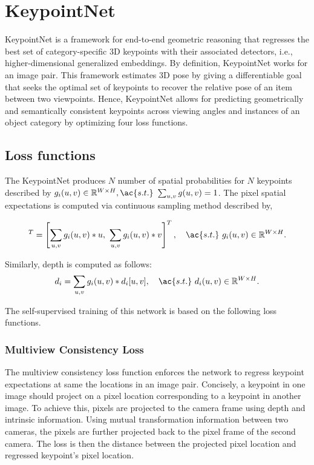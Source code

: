\section{KeypointNet}

KeypointNet is a framework for end-to-end geometric reasoning that regresses the best set of category-specific 3D keypoints with their associated detectors, i.e., higher-dimensional generalized embeddings.
By definition, KeypointNet works for an image pair.
This framework estimates 3D pose by giving a differentiable goal that seeks the optimal set of keypoints to recover the relative pose of an item between two viewpoints.
Hence, KeypointNet allows for predicting geometrically and semantically consistent keypoints across viewing angles and instances of an object category by optimizing four loss functions.\\


\subsection{Loss functions}

The KeypointNet produces $N$ number of spatial probabilities for $N$ keypoints described by $g_i(u,v) \in \mathbb{R}^{W \times H}, \ac{s.t.} \ \sum_{u,v} g(u,v) = 1$.
The pixel spatial expectations is computed via continuous sampling method described by,

\begin{equation}
    [u_i, v_i]^T =  \left[ \displaystyle\sum_{u, v} g_i(u, v) * u , \  \displaystyle\sum_{u, v} g_i(u, v) * v \right]^T, \quad \ac{s.t.} \ g_i(u,v) \in \mathbb{R}^{W \times H}.
\end{equation}

\noindent Similarly, depth is computed as follows:
\begin{equation}
    d_i = \displaystyle\sum_{u, v} g_i(u, v) * d_i[u, v], \quad \ac{s.t.} \ d_i(u,v) \in \mathbb{R}^{W \times H}.
\end{equation}

The self-supervised training of this network is based on the following loss functions.






\subsubsection{Multiview Consistency Loss}

The multiview consistency loss function enforces the network to regress keypoint expectations at same the locations in an image pair.
Concisely, a keypoint in one image should project on a pixel location corresponding to a keypoint in another image.
To achieve this, pixels are projected to the camera frame using depth and intrinsic information. Using mutual transformation information
between two cameras, the pixels are further projected back to the pixel frame of the second camera. The loss is then the distance between the projected pixel location and
regressed keypoint's pixel location. \\

